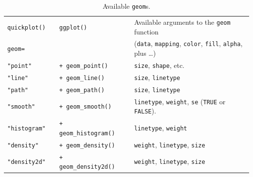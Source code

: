 \begin{fullwidth}
\begin{table}
\caption{Available \texttt{geom}s.\label{tab:geom}}
\begin{center}
\vspace*{18pt}

\begin{minipage}[t]{0.975\textwidth}
\setcounter{mpfootnote}{\value{footnote}}
\renewcommand{\thempfootnote}{\arabic{mpfootnote}}
\hspace*{6pt} \begin{tabular}{lllll}
  \texttt{quickplot()} && \texttt{ggplot()} && Available arguments to
  the \texttt{geom} function\\
\cline{1-1} \cline{3-3} \cline{5-5}
\texttt{geom=} &&  && (\texttt{data}, \texttt{mapping},
\texttt{color}, \texttt{fill}, \texttt{alpha}, plus \ldots)\\
\cline{1-1} \cline{3-3} \cline{5-5}
  \texttt{"point"} &&\verb!+ geom_point()! && \texttt{size},
  \texttt{shape}, etc.\\
  \texttt{"line"} &&\verb!+ geom_line()! &&
  \texttt{size}, \texttt{linetype}
  \\
  \texttt{"path"} &&\verb!+ geom_path()!\footnotemark[1] &&
  \texttt{size}, \texttt{linetype}
  \\
  \texttt{"smooth"} &&\verb!+ geom_smooth()! &&
  \texttt{linetype},
  \texttt{weight}, \texttt{se} (\texttt{TRUE} or \texttt{FALSE}).
  \\
  \texttt{"histogram"} &&\verb!+ geom_histogram()! &&
  \texttt{linetype}, \texttt{weight}
  \\
  \texttt{"density"} &&\verb!+ geom_density()! &&
\texttt{weight},  \texttt{linetype}, \texttt{size}
\\
  \texttt{"density2d"} &&\verb!+ geom_density2d()! &&
\texttt{weight},  \texttt{linetype}, \texttt{size}\\
\end{tabular}
\setcounter{footnote}{\value{mpfootnote}}
\end{minipage}
\end{center}
\end{table}
\end{fullwidth}

